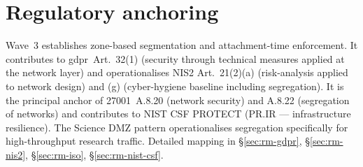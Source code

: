 \section{Regulatory anchoring}
\label{sec:w3-regulatory}

\noindent Wave~3 establishes zone-based segmentation and
attachment-time enforcement. It contributes to
\gls{gdpr}~Art.~32(1) (security through technical measures
applied at the network layer) and operationalises NIS2
Art.~21(2)(a) (risk-analysis applied to network design) and
(g) (cyber-hygiene baseline including segregation). It is the
principal anchor of 27001~A.8.20 (network security) and A.8.22
(segregation of networks) and contributes to NIST CSF
\textsf{PROTECT} (PR.IR --- infrastructure resilience). The
Science DMZ pattern operationalises segregation specifically for
high-throughput research traffic. Detailed mapping in
 \S\ref{sec:rm-gdpr},
\S\ref{sec:rm-nis2}, \S\ref{sec:rm-iso},
\S\ref{sec:rm-nist-csf}.
